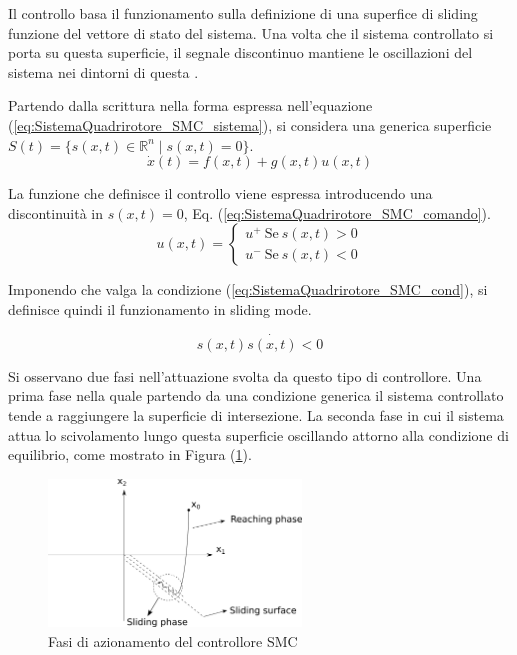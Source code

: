 Il controllo basa il funzionamento sulla definizione di una superfice di sliding funzione del vettore di stato del sistema. Una volta che il sistema controllato si porta su questa superficie, il segnale discontinuo mantiene le oscillazioni del sistema nei dintorni di questa \cite{DesTestCarm}.

Partendo dalla scrittura nella forma espressa nell'equazione (\ref{eq:SistemaQuadrirotore_SMC_sistema}), si considera una generica superficie $S(t) = \{ s(x,t) \in \mathbb{R}^n  \mid s(x,t) = 0\}$.
\begin{equation}\label{eq:SistemaQuadrirotore_SMC_sistema}
	\dot{x}(t) = f(x,t) +g(x,t) u(x,t)
\end{equation}

La funzione che definisce il controllo viene espressa introducendo una discontinuità in $s(x,t)=0$, Eq. (\ref{eq:SistemaQuadrirotore_SMC_comando}).
\begin{equation}\label{eq:SistemaQuadrirotore_SMC_comando}
	u(x,t) = \begin{cases}
		u^+ \ \text{Se} \ s(x,t) > 0 \\
		u^- \ \text{Se} \ s(x,t) < 0
	\end{cases}
\end{equation}

Imponendo che valga la condizione (\ref{eq:SistemaQuadrirotore_SMC_cond}), si definisce quindi il funzionamento in sliding mode.

\begin{equation}\label{eq:SistemaQuadrirotore_SMC_cond}
	s(x,t) \dot{s(x,t)} < 0
\end{equation}

Si osservano due fasi nell'attuazione svolta da questo tipo di controllore. Una prima fase nella quale partendo da una condizione generica il sistema controllato tende a raggiungere la superficie di intersezione. La seconda fase in cui il sistema attua lo scivolamento lungo questa superficie oscillando attorno alla condizione di equilibrio, come mostrato in Figura (\ref{fig:SMC}).

\begin{figure}
	\centering
	\includegraphics[width=0.6\textwidth]{SistemaQuadrirotore/Figure/SMC_fasi}
	\caption{Fasi di azionamento del controllore SMC \cite{LiShihua2017AiVS}}
	\label{fig:SMC}
\end{figure}


